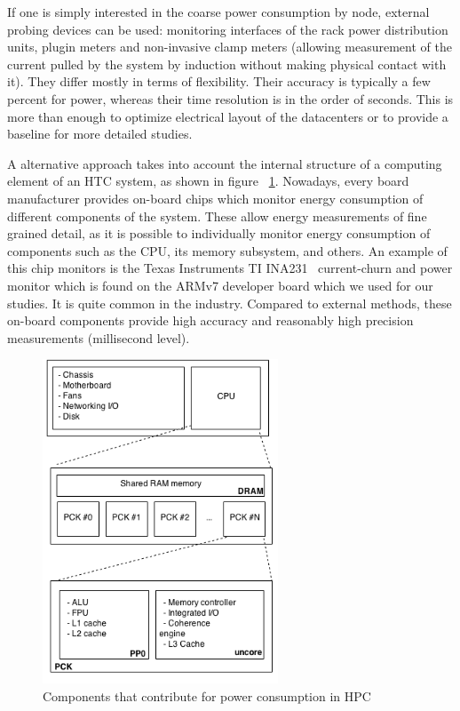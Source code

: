 If one is simply interested in the coarse power consumption by node,
external probing devices can be used: monitoring interfaces
of the rack power distribution units, plugin meters and non-invasive
clamp meters (allowing measurement of the
current pulled by the system by induction without making physical
contact with it). They differ mostly in terms of flexibility.
Their accuracy is typically a few percent for power, whereas their time
resolution is in the order of seconds. This is more than enough
to optimize electrical layout of the datacenters or to provide a
baseline for more detailed studies.

A alternative approach takes into account the internal structure of a
computing element of an HTC system, as shown in figure 
~\ref{fig:power-consumption-model}. Nowadays, every board manufacturer
provides on-board chips which monitor energy consumption of
different components of the system. These
allow energy measurements of fine grained detail, as it is possible
to individually monitor energy consumption of components such as
the CPU, its memory subsystem, and others. An example of this chip
monitors is the Texas Instruments TI INA231~\cite{TIINA231} current-churn
and power monitor which is found on the ARMv7 developer board which
we used for our studies. It is quite common in the industry.
Compared to external methods, these on-board components provide
high accuracy and reasonably high precision measurements (millisecond
level).

\begin{figure}[tbp]
\centering
\includegraphics[width=70mm]{img/energy_model.png}
\caption{Components that contribute for power consumption in HPC}
\label{fig:power-consumption-model}
\end{figure}

